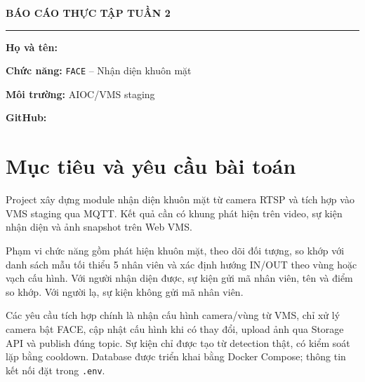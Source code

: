 \documentclass[11pt,a4paper]{article}
\newcommand{\TenBaoCao}{}
\newcommand{\HoTen}{}
\newcommand{\Github}{}
\newcommand{\truong}[1]{\if\relax\detokenize{#1}\relax\rule{0.70\linewidth}{0.4pt}\else#1\fi}
\begin{document}
\thispagestyle{plain}
\begin{center}
{\large\bfseries BÁO CÁO THỰC TẬP TUẦN 2\par}
\vspace{4pt}
{\LARGE\bfseries
\if\relax\expandafter\detokenize\expandafter{\TenBaoCao}\relax
  \rule{0.72\linewidth}{0.4pt}%
\else
  \TenBaoCao
\fi\par}
\end{center}
\vspace{3pt}
\begingroup
\setlength{\parskip}{3pt}
\textbf{Họ và tên:} \expandafter\truong\expandafter{\HoTen}\par
\textbf{Chức năng:} \texttt{FACE} -- Nhận diện khuôn mặt\par
\textbf{Môi trường:} AIOC/VMS staging\par
\textbf{GitHub:} \expandafter\truong\expandafter{\Github}\par
\endgroup
\vspace{2pt}

\section{Mục tiêu và yêu cầu bài toán}
Project xây dựng module nhận diện khuôn mặt từ camera RTSP và tích hợp vào VMS staging qua MQTT. Kết quả cần có khung phát hiện trên video, sự kiện nhận diện và ảnh snapshot trên Web VMS.

Phạm vi chức năng gồm phát hiện khuôn mặt, theo dõi đối tượng, so khớp với danh sách mẫu tối thiểu 5 nhân viên và xác định hướng IN/OUT theo vùng hoặc vạch cấu hình. Với người nhận diện được, sự kiện gửi mã nhân viên, tên và điểm so khớp. Với người lạ, sự kiện không gửi mã nhân viên.

Các yêu cầu tích hợp chính là nhận cấu hình camera/vùng từ VMS, chỉ xử lý camera bật FACE, cập nhật cấu hình khi có thay đổi, upload ảnh qua Storage API và publish đúng topic. Sự kiện chỉ được tạo từ detection thật, có kiểm soát lặp bằng cooldown. Database được triển khai bằng Docker Compose; thông tin kết nối đặt trong \texttt{.env}.
\end{document}
